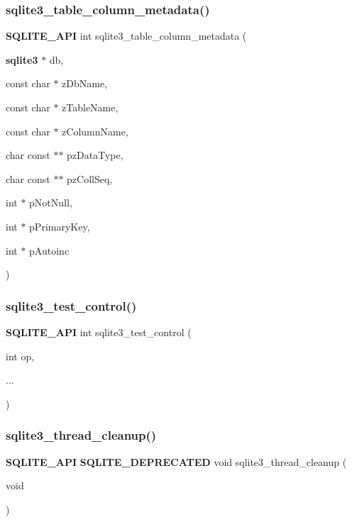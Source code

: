 \subsubsection{sqlite3\_table\_column\_metadata()}
{\footnotesize\ttfamily \textbf{ S\+Q\+L\+I\+T\+E\+\_\+\+A\+PI} int sqlite3\+\_\+table\+\_\+column\+\_\+metadata (\begin{DoxyParamCaption}\item[{\textbf{ sqlite3} $\ast$}]{db,  }\item[{const char $\ast$}]{z\+Db\+Name,  }\item[{const char $\ast$}]{z\+Table\+Name,  }\item[{const char $\ast$}]{z\+Column\+Name,  }\item[{char const $\ast$$\ast$}]{pz\+Data\+Type,  }\item[{char const $\ast$$\ast$}]{pz\+Coll\+Seq,  }\item[{int $\ast$}]{p\+Not\+Null,  }\item[{int $\ast$}]{p\+Primary\+Key,  }\item[{int $\ast$}]{p\+Autoinc }\end{DoxyParamCaption})}

\mbox{\label{sqlite3_8h_a3d90fdf0f259711a4e3822e12cd86106}} 
\subsubsection{sqlite3\_test\_control()}
{\footnotesize\ttfamily \textbf{ S\+Q\+L\+I\+T\+E\+\_\+\+A\+PI} int sqlite3\+\_\+test\+\_\+control (\begin{DoxyParamCaption}\item[{int}]{op,  }\item[{}]{... }\end{DoxyParamCaption})}

\mbox{\label{sqlite3_8h_a34980c829db84f02e1a1599063469f06}} 
\subsubsection{sqlite3\_thread\_cleanup()}
{\footnotesize\ttfamily \textbf{ S\+Q\+L\+I\+T\+E\+\_\+\+A\+PI} \textbf{ S\+Q\+L\+I\+T\+E\+\_\+\+D\+E\+P\+R\+E\+C\+A\+T\+ED} void sqlite3\+\_\+thread\+\_\+cleanup (\begin{DoxyParamCaption}\item[{void}]{ }\end{DoxyParamCaption})}

